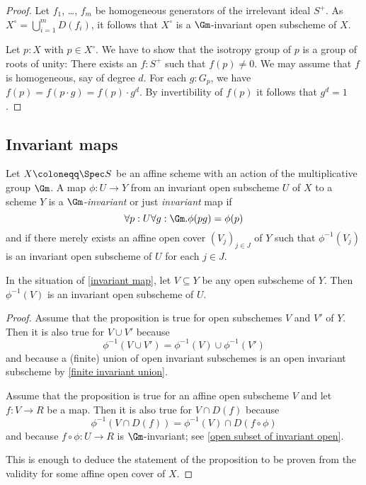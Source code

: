 \begin{proof}
  Let $f_1$, \dots, $f_m$ be homogeneous generators of the irrelevant
  ideal $S^+$.  As
  $X^\circ = \bigcup_{i = 1}^m D(f_i)$, it follows that $X^\circ$ is a
  $\Gm$-invariant open subscheme of $X$.

  Let $p : X$ with $p \in X^\circ$.  We have to show that the isotropy group of $p$
  is a group of roots of unity: There exists an $f : S^+$ such that
  $f(p) \neq 0$.  We may assume that $f$ is homogeneous, say of degree
  $d$.  For each $g : G_p$, we have
  $f(p) = f(p \cdot g) = f(p) \cdot g^d$.  By invertibility of $f(p)$
  it follows that $g^d = 1$.
\end{proof}

\subsection{Invariant maps}

\begin{definition}\label{invariant map}
  Let $X \coloneqq \Spec S$ be an affine scheme with an action of the
  multiplicative group $\Gm$.  A map $\phi\colon U \to Y$ from an
  invariant open subscheme $U$ of $X$ to a scheme $Y$ is a
  \emph{$\Gm$-invariant} or just \emph{invariant} map if
  \begin{equation*}
    \forall p : U \forall g : \Gm. \phi(pg) = \phi(p)
  \end{equation*}
  and if there merely exists
  an affine open cover $(V_j)_{j \in J}$ of $Y$ such that $\phi^{-1}(V_j)$
  is an invariant open subscheme of $U$ for each $j \in J$.
\end{definition}

\begin{proposition}\label{inverse invariant image}
  In the situation of \cref{invariant map}, let $V \subseteq Y$ be any
  open subscheme of $Y$.  Then $\phi^{-1}(V)$ is an invariant open
  subscheme of $U$.
\end{proposition}

\begin{proof}
  Assume that the proposition is true for open subschemes $V$ and $V'$
  of $Y$. Then it is also true for $V \cup V'$ because
  \begin{equation*}
    \phi^{-1}(V \cup V') = \phi^{-1}(V) \cup \phi^{-1}(V')
  \end{equation*}
  and because a (finite) union of open invariant subschemes is an open
  invariant subscheme by \cref{finite invariant union}.

  Assume that the proposition is true for an affine open subscheme $V$
  and let $f\colon V \to R$ be a map.  Then it is also true for $V
  \cap D(f)$ because
  \begin{equation*}
    \phi^{-1}(V \cap D(f)) = \phi^{-1}(V) \cap D(f \circ \phi)
  \end{equation*}
  and because $f \circ \phi\colon U \to R$ is $\Gm$-invariant; see
  \cref{open subset of invariant open}.

  This is enough to deduce the statement of the proposition to be
  proven from the validity for some affine open cover of $X$.
\end{proof}

